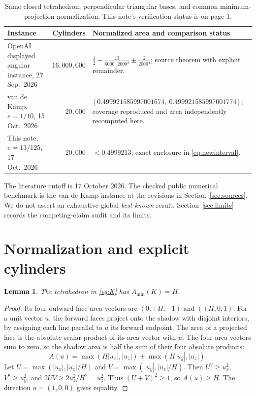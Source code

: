 \documentclass[11pt]{article}
\newtheorem{lemma}[theorem]{Lemma}
\newcommand{\Amin}{A_{\min}}
\begin{document}
\begin{table}[ht]
\centering\small
\begin{tabularx}{\textwidth}{@{}p{}rX@{}}
\toprule
Instance & Cylinders & Normalized area and comparison status\\
\midrule
OpenAI displayed angular instance, 27 Sep.\ 2026
& \(16{,}000{,}000\) &
\(\frac12-\frac{13}{6000\cdot2000^2}\pm\frac{2}{2000^4}\);
source theorem with explicit remainder.\\
\addlinespace
van de Kamp, \(e=1/10\), 15 Oct.\ 2026
& \(20{,}000\) &
\([0.499921585997001674,\ 0.499921585997001774]\);
coverage reproduced and area independently recomputed here.\\
\addlinespace
This note, \(e=13/125\), 17 Oct.\ 2026
& \(20{,}000\) &
\(<0.4999213\); exact enclosure in \eqref{eq:newinterval}.\\
\bottomrule
\end{tabularx}
\caption{Same closed tetrahedron, perpendicular triangular bases, and common
minimum-projection normalization. This note's verification status is on page 1.}
\label{tab:comparison}
\end{table}
The literature cutoff is 17 October 2026. The checked public numerical
benchmark is the van de Kamp instance at the revisions in
Section~\ref{sec:sources}. We do not assert an exhaustive global
\emph{best-known} result. Section~\ref{sec:limits} records the
competing-claim audit and its limits.

\section{Normalization and explicit cylinders}
\begin{lemma}\label{lem:normalization}
The tetrahedron in \eqref{eq:K} has \(\Amin(K)=H\).
\end{lemma}
\begin{proof}
Its four outward face area vectors are \((0,\pm H,-1)\) and
\((\pm H,0,1)\).
For a unit vector \(u\), the forward faces project onto the shadow with
disjoint interiors, by assigning each line parallel to \(u\) its forward
endpoint. The area of a projected face is the absolute scalar product
of its area vector with \(u\). The four area vectors sum to zero,
so the shadow area is half the sum of their four absolute products:
\[
 A(u)=\max(H|u_x|,|u_z|)+\max(H|u_y|,|u_z|).
\]
Let \(U=\max(|u_x|,|u_z|/H)\) and \(V=\max(|u_y|,|u_z|/H)\).
Then \(U^2\ge u_x^2\), \(V^2\ge u_y^2\), and
\(2UV\ge2u_z^2/H^2=u_z^2\).
Thus \((U+V)^2\ge1\), so \(A(u)\ge H\).
The direction \(u=(1,0,0)\) gives equality.
\end{proof}
\end{document}
